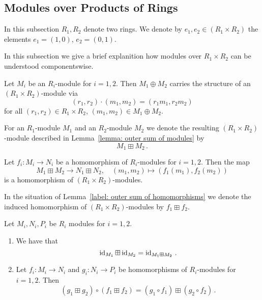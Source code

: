 \subsection{Modules over Products of Rings}


\begin{conventions}
  In this subsection $R_1, R_2$ denote two rings.
  We denote by $e_1, e_2 \in (R_1 \times R_2)$ the elements $e_1 = (1,0)$, $e_2 = (0,1)$.
\end{conventions}


\begin{fluff}
  In this subsection we give a brief explanition how modules over $R_1 \times R_2$ can be understood componentswise.
\end{fluff}


\begin{lemma}
  \label{lemma: outer sum of modules}
  Let $M_i$ be an $R_i$-module for $i = 1, 2$.
  Then $M_1 \oplus M_2$ carries the structure of an $(R_1 \times R_2)$-module via
  \[
      (r_1, r_2) \cdot (m_1, m_2)
    = (r_1 m_1, r_2 m_2)
  \]
  for all $(r_1, r_2) \in R_1 \times R_2$, $(m_1, m_2) \in M_1 \oplus M_2$.
\end{lemma}


\begin{definition}
  For an $R_1$-module $M_1$ and an $R_2$-module $M_2$ we denote the resulting $(R_1 \times R_2)$-module described in Lemma~\ref{lemma: outer sum of modules} by
  \[
    M_1 \boxplus M_2 \,.
  \]
\end{definition}


\begin{lemma}
  \label{label: outer sum of homomorphisms}
  Let $f_i \colon M_i \to N_i$ be a homomorphism of $R_i$-modules for $i = 1, 2$.
  Then the map
  \[
            M_1 \boxplus M_2
    \to     N_1 \boxplus N_2,
    \quad   (m_1, m_2)
    \mapsto (f_1(m_1), f_2(m_2))
  \]
  is a homomorphism of $(R_1 \times R_2)$-modules.
\end{lemma}


\begin{definition}
  In the situation of Lemma~\ref{label: outer sum of homomorphisms} we denote the induced homomorphism of $(R_1 \times R_2)$-modules by $f_1 \boxplus f_2$.
\end{definition}


\begin{lemma}
  Let $M_i, N_i, P_i$ be $R_i$ modules for $i = 1, 2$.
  \begin{enumerate}
    \item
      We have that
      \[
          \operatorname{id}_{M_1} \boxplus \operatorname{id}_{M_2}
        = \operatorname{id}_{M_1 \boxplus M_2} \,.
      \]
    \item
      Let $f_i \colon M_i \to N_i$ and $g_i \colon N_i \to P_i$ be homomorphisms of $R_i$-modules for $i = 1, 2$.
      Then
      \[
          (g_1 \boxplus g_2) \circ (f_1 \boxplus f_2)
        = (g_1 \circ f_1) \boxplus (g_2 \circ f_2) \,.
      \]
  \end{enumerate}
\end{lemma}


